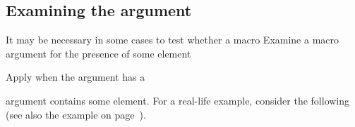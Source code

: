 \subsection{Examining the argument}

It may be necessary in some cases to test whether a macro
\howto Examine a macro argument for the presence of some element\par
\howto Apply  when the argument has a \par
argument contains some element. For a real-life example,
consider the following (see also the 
\alt
example on page~\pageref{left:display}).


